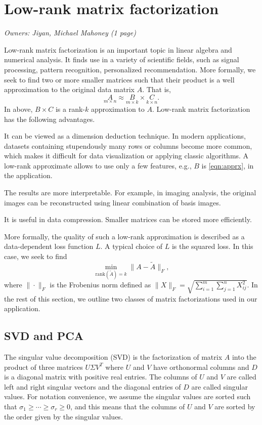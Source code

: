 \section{Low-rank matrix factorization}
\label{sxn:low-rank-methods}
\textit{Owners: Jiyan, Michael Mahoney (1 page)}

Low-rank matrix factorization is an important topic in linear algebra and numerical analysis.
It finds use in a variety of scientific fields, such as signal processing, pattern recognition, personalized recommendation.
More formally, we seek to find two or more smaller matrices such that their product is a well approximation to the original data matrix $A$.
That is,
\begin{equation}
 \label{eqn:apprx}
    \underset{m\times n}{A} \approx \underset{m\times k}{B} \times \underset{k\times n}{C}.
\end{equation}
In above, $B \times C$ is a rank-$k$ approximation to $A$.
Low-rank matrix factorization has the following advantages.
\begin{compactitem}
\item
It can be viewed as a dimension deduction technique.
In modern applications, datasets containing stupendously many rows or columns become more common, which makes it difficult for data visualization or applying classic algorithms. A low-rank approximate allows to use only a few features, e.g., $B$ is \eqref{eqn:apprx}, in the application.
\item
The results are more interpretable.
For example, in imaging analysis, the original images can be reconstructed using linear combination of basis images.
\item
It is useful in data compression.
Smaller matrices can be stored more efficiently.
\end{compactitem}

More formally, the quality of such a low-rank approximation is described as a data-dependent loss function $L$. A typical choice of $L$ is the squared loss. In this case, we seek to find
\begin{equation}
 \label{eqn:obj}
  \min_{\text{rank}(\tilde A) = k} \| A - \tilde A \|_F,
\end{equation}
where $\| \cdot \|_F$ is the Frobenius norm defined as $\|X\|_F = \sqrt{ \sum_{i=1}^m \sum_{j=1}^n X_{ij}^2 }$.
In the rest of this section, we outline two classes of matrix factorizations used in our application.

\subsection{SVD and PCA}
The singular value decomposition (SVD) is the factorization of matrix $A$ into the product of three matrices $U\Sigma V^T$ where $U$ and $V$ have orthonormal columns and $D$ is a diagonal matrix with positive real entries. The columns of $U$ and $V$ are called left and right singular vectors and the diagonal entries of $D$ are called singular values. For notation convenience, we assume the singular values are sorted such that $\sigma_1\geq \cdots \geq \sigma_r\geq 0$, and
this means that the columns of $U$ and $V$ are sorted by the order given by the singular values.  

